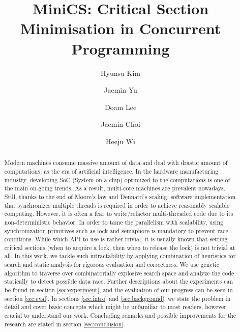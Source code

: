 \documentclass[sigconf]{acmart}
\begin{document}
\title{MiniCS: Critical Section Minimisation in Concurrent Programming}
\author{Hyunsu Kim}

\author{Jaemin Yu}

\author{Doam Lee}

\author{Jaemin Choi}

\author{Heeju Wi}

\begin{abstract}
Modern machines consume massive amount of data and deal with drastic amount of computations, as the era of artificial intelligence. In the hardware manufacturing industry, developing SoC (System on a chip) optimized to the computations is one of the main on-going trends. As a result, multi-core machines are prevalent nowadays. 
Still, thanks to the end of Moore's law and Dennard's scaling, software implementation that synchronizes multiple threads is required in order to achieve reasonably scalable computing. However, it is often a fear to write/refactor multi-threaded code due to its non-deterministic behavior. 
In order to tame the parallelism with scalability, using synchronization primitives such as lock and semaphore is mandatory to prevent race conditions. While which API to use is rather trivial, it is usually known that setting critical sections (when to acquire a lock, then when to release the lock) is not trivial at all. 
In this work, we tackle such intractability by applying combination of heuristics for search and static analysis for rigorous evaluation and correctness. We use genetic algorithm to traverse over combinatorially explosive search space and analyze the code statically to detect possible data race. Further descriptions about the experiments can be found in section \ref{sec:experiment}, and the evaluation of our progress can be seen in section \ref{sec:eval}. In sections \ref{sec:intro} and \ref{sec:background}, we state the problem in detail and cover basic concepts which might be unfamiliar to most readers, however crucial to understand our work. Concluding remarks and possible improvements for the research are stated in section \ref{sec:conclusion}. 
\end{abstract}
\end{document}
